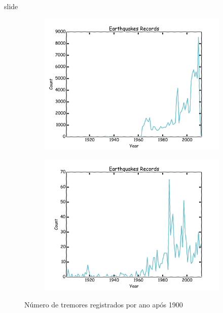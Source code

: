 \documentclass[ucs,8pt]{beamer}
\begin{document}
\begin{frame}{slide}


\begin{figure}[H]
	\centering
	\begin{subfigure}[b]{0.48\textheight}
		  	\centering
			\includegraphics[height=1.00\textheight]{hmtk_sa3_rate}
			\label{fig:sa_eq_record}
	\end{subfigure}%
	\quad %
	\begin{subfigure}[b]{0.48\textheight}
		  	\centering
			\includegraphics[height=1.00\textheight]{hmtk_bsb2013_rate}
			\label{fig:br_eq_record}
    \end{subfigure}%
	\caption{Número de tremores registrados por ano após 1900}
	\label{fig:eq_record}
\end{figure}




\end{frame}
\end{document}
